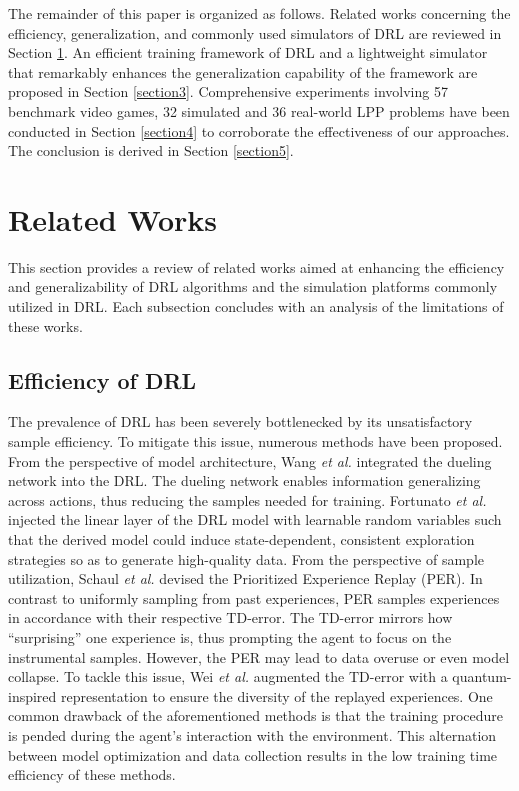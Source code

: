 \documentclass[journal]{IEEEtran}
\begin{document}
The remainder of this paper is organized as follows. Related works concerning the efficiency, generalization, and commonly used simulators of DRL are reviewed in Section \ref{section2}. An efficient training framework of DRL and a lightweight simulator that remarkably enhances the generalization capability of the framework are proposed in Section \ref{section3}. Comprehensive experiments involving 57 benchmark video games, 32 simulated and 36 real-world LPP problems have been conducted in Section \ref{section4} to corroborate the effectiveness of our approaches. The conclusion is derived in Section \ref{section5}.

\section{Related Works}
\label{section2}

This section provides a review of related works aimed at enhancing the efficiency and generalizability of DRL algorithms and the simulation platforms commonly utilized in DRL. Each subsection concludes with an analysis of the limitations of these works.

\subsection{Efficiency of DRL}
The prevalence of DRL has been severely bottlenecked by its unsatisfactory sample efficiency. To mitigate this issue, numerous methods have been proposed. From the perspective of model architecture, Wang \textit{et al.} \cite{duel} integrated the dueling network into the DRL. The dueling network enables information generalizing across actions, thus reducing the samples needed for training. Fortunato \textit{et al.} \cite{noisy} injected the linear layer of the DRL model with learnable random variables such that the derived model could induce state-dependent, consistent exploration strategies so as to generate high-quality data. From the perspective of sample utilization, Schaul \textit{et al.} \cite{PER} devised the Prioritized Experience Replay (PER). In contrast to uniformly sampling from past experiences, PER samples experiences in accordance with their respective TD-error. The TD-error mirrors how “surprising” one experience is, thus prompting the agent to focus on the instrumental samples. However, the PER may lead to data overuse or even model collapse. To tackle this issue, Wei \textit{et al.} \cite{QER} augmented the TD-error with a quantum-inspired representation to ensure the diversity of the replayed experiences. One common drawback of the aforementioned methods is that the training procedure is pended during the agent's interaction with the environment. This alternation between model optimization and data collection results in the low training time efficiency of these methods.
\end{document}
